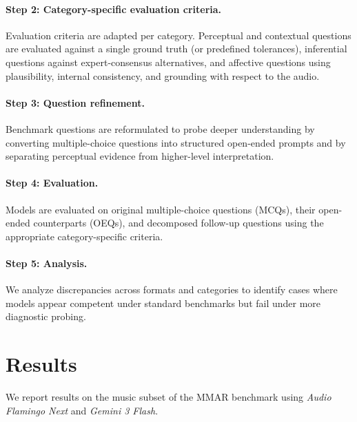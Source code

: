 \documentclass[conference,a4paper]{APSIPA2026}
\begin{document}
\paragraph{Step 2: Category-specific evaluation criteria.}
Evaluation criteria are adapted per category. Perceptual and contextual questions are evaluated against a single ground truth (or predefined tolerances), inferential questions against expert-consensus alternatives, and affective questions using plausibility, internal consistency, and grounding with respect to the audio.

\paragraph{Step 3: Question refinement.}
Benchmark questions are reformulated to probe deeper understanding by converting multiple-choice questions into structured open-ended prompts and by separating perceptual evidence from higher-level interpretation.

\paragraph{Step 4: Evaluation.}
Models are evaluated on original multiple-choice questions (MCQs), their open-ended counterparts (OEQs), and decomposed follow-up questions using the appropriate category-specific criteria.

\paragraph{Step 5: Analysis.}
We analyze discrepancies across formats and categories to identify cases where models appear competent under standard benchmarks but fail under more diagnostic probing.

\section{Results}
\label{sec:benchmarks}

We report results on the music subset of the MMAR benchmark using \emph{Audio Flamingo Next} and \emph{Gemini 3 Flash}.
\end{document}
